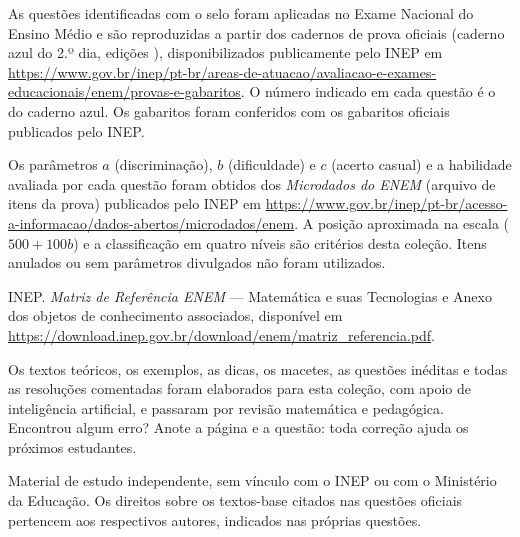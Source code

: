 
As questões identificadas com o selo  foram aplicadas no
Exame Nacional do Ensino Médio e são reproduzidas a partir dos cadernos de prova oficiais
(caderno azul do 2.º dia, edições \anosbanco), disponibilizados publicamente pelo INEP em
\url{https://www.gov.br/inep/pt-br/areas-de-atuacao/avaliacao-e-exames-educacionais/enem/provas-e-gabaritos}.
O número indicado em cada questão é o do caderno azul. Os gabaritos foram conferidos com os
gabaritos oficiais publicados pelo INEP.

Os parâmetros $a$ (discriminação), $b$ (dificuldade) e $c$ (acerto casual) e a habilidade avaliada
por cada questão foram obtidos dos \emph{Microdados do ENEM} (arquivo de itens da prova) publicados
pelo INEP em \url{https://www.gov.br/inep/pt-br/acesso-a-informacao/dados-abertos/microdados/enem}.
A posição aproximada na escala ($500 + 100b$) e a classificação em quatro níveis são critérios
desta coleção. Itens anulados ou sem parâmetros divulgados não foram utilizados.

INEP. \emph{Matriz de Referência ENEM} — Matemática e suas Tecnologias e Anexo dos objetos de
conhecimento associados, disponível em \url{https://download.inep.gov.br/download/enem/matriz_referencia.pdf}.

Os textos teóricos, os exemplos, as dicas, os macetes, as questões inéditas e todas as resoluções
comentadas foram elaborados para esta coleção, com apoio de inteligência artificial, e passaram
por revisão matemática e pedagógica. Encontrou algum erro? Anote a página e a questão: toda
correção ajuda os próximos estudantes.

Material de estudo independente, sem vínculo com o INEP ou com o Ministério da Educação.
Os direitos sobre os textos-base citados nas questões oficiais pertencem aos respectivos autores,
indicados nas próprias questões.
